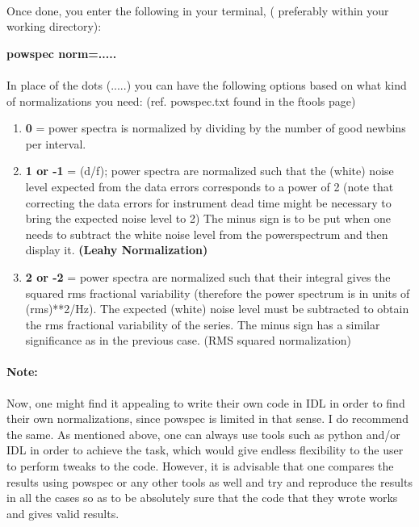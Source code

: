 \documentclass[a4paper,twoside]{report}
\numberwithin{equation}{section}
\begin{document}
\paragraph{}
Once done, you enter the following in your terminal, ( preferably within your working directory):
\begin{center}
\textbf{powspec norm=.....}
\end{center}
\paragraph{}
In place of the dots (.....) you can have the following options based on what kind of normalizations you need: (ref. powspec.txt found in the ftools page)
\begin{enumerate}
\item \textbf{0} = power spectra is normalized by dividing by the number of good newbins per interval.
\item \textbf{1 or -1} = (d/f); power spectra are normalized such that the (white) noise level expected from the data errors corresponds to a power of 2 (note that correcting the data errors for instrument dead time might be necessary to bring the expected noise level to 2) The minus sign is to be put when one needs to subtract the white noise level from the powerspectrum and then display it. \textbf{(Leahy Normalization)}
\item \textbf{2 or -2} = power spectra are normalized such that their integral gives the squared rms fractional variability (therefore the power spectrum is in units of (rms)**2/Hz). The expected (white) noise level must be subtracted to obtain the rms fractional variability of the series. The minus sign has a similar significance as in the previous case. (RMS squared normalization)
\end{enumerate}
\paragraph{Note:}
Now, one might find it appealing to write their own code in IDL in order to find their own normalizations, since powspec is limited in that sense. I do recommend the same. As mentioned above, one can always use tools such as python and/or IDL in order to achieve the task, which would give endless flexibility to the user to perform tweaks to the code. However, it is advisable that one compares the results using powspec or any other tools as well and try and reproduce the results in all the cases so as to be absolutely sure that the code that they wrote works and gives valid results. 
\end{document}
